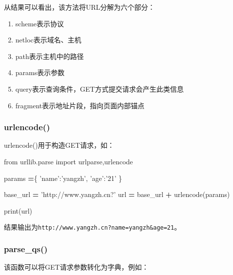 \documentclass[]{ctexbook}
\newenvironment{Shaded}{\begin{snugshade}}{\end{snugshade}}
\newcommand{\BuiltInTok}[1]{#1}
\newcommand{\ImportTok}[1]{#1}
\newcommand{\NormalTok}[1]{#1}
\newcommand{\OperatorTok}[1]{\textcolor[rgb]{0.81,0.36,0.00}{\textbf{#1}}}
\newcommand{\StringTok}[1]{\textcolor[rgb]{0.31,0.60,0.02}{#1}}
\providecommand{\tightlist}{%
  \setlength{\itemsep}{0pt}\setlength{\parskip}{0pt}}
\begin{document}
从结果可以看出，该方法将URL分解为六个部分：

\begin{enumerate}
\def\labelenumi{\arabic{enumi}.}
\tightlist
\item
  scheme表示协议
\item
  netloc表示域名、主机
\item
  path表示主机中的路径
\item
  params表示参数
\item
  query表示查询条件，GET方式提交请求会产生此类信息
\item
  fragment表示地址片段，指向页面内部锚点
\end{enumerate}

\hypertarget{urlencode}{%
\subsubsection{urlencode()}\label{urlencode}}

urlencode()用于构造GET请求，如：

\begin{Shaded}
\begin{Highlighting}[]
\ImportTok{from}\NormalTok{ urllib.parse }\ImportTok{import}\NormalTok{ urlparse,urlencode}

\NormalTok{params }\OperatorTok{=}\NormalTok{\{}
    \StringTok{'name'}\NormalTok{:}\StringTok{'yangzh'}\NormalTok{,}
    \StringTok{'age'}\NormalTok{:}\StringTok{'21'}
\NormalTok{\}}

\NormalTok{base_url }\OperatorTok{=} \StringTok{'http://www.yangzh.cn?'}
\NormalTok{url }\OperatorTok{=}\NormalTok{ base_url }\OperatorTok{+}\NormalTok{ urlencode(params)}

\BuiltInTok{print}\NormalTok{(url)}
\end{Highlighting}
\end{Shaded}

结果输出为\texttt{http://www.yangzh.cn?name=yangzh\&age=21}。

\hypertarget{parse_qs}{%
\subsubsection{parse\_qs()}\label{parse_qs}}

该函数可以将GET请求参数转化为字典，例如：
\end{document}
